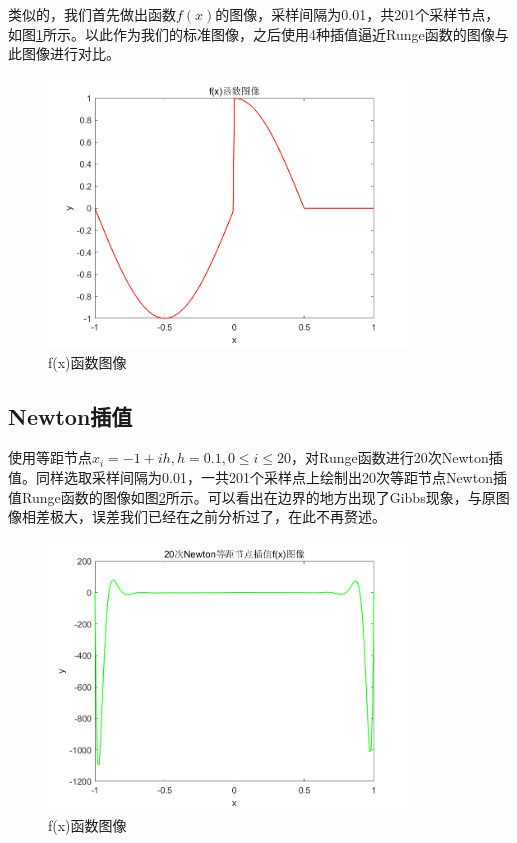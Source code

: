 \documentclass[a4paper]{article}
\begin{document}
类似的，我们首先做出函数$f(x)$的图像，采样间隔为0.01，共201个采样节点，如图\ref{fig:10}所示。以此作为我们的标准图像，之后使用4种插值逼近Runge函数的图像与此图像进行对比。

\begin{figure}[!h]
	\centering
	\includegraphics[width=0.85\textwidth]{../code/result/f}
	\caption{\label{fig:10}f(x)函数图像}
\end{figure}

\subsection{Newton插值}
使用等距节点$x_i=-1+ih,h=0.1,0\le i\le 20$，对Runge函数进行20次Newton插值。同样选取采样间隔为0.01，一共201个采样点上绘制出20次等距节点Newton插值Runge函数的图像如图\ref{2fig:1}所示。可以看出在边界的地方出现了Gibbs现象，与原图像相差极大，误差我们已经在之前分析过了，在此不再赘述。

\begin{figure}[!h]
	\centering
	\includegraphics[width=0.85\textwidth]{../code/result/newtonf}
	\caption{\label{2fig:1}f(x)函数图像}
\end{figure}
\end{document}
